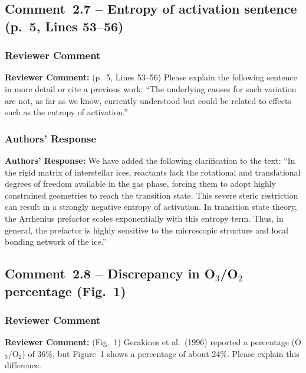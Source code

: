 \documentclass[12pt]{article}
\newcommand{\reviewlabel}{\textbf{\textcolor{commentframe}{Reviewer Comment:}}}
\newcommand{\responselabel}{\textbf{\textcolor{responseframe}{Authors' Response:}}}
\begin{document}
\subsection{Comment~2.7 -- Entropy of activation sentence (p.~5, Lines 53--56)}

\subsubsection{Reviewer Comment}
\begin{reviewerbox}
\reviewlabel{} (p.~5, Lines 53--56) Please explain the following sentence in
more detail or cite a previous work: ``The underlying causes for such
variation are not, as far as we know, currently understood but could be
related to effects such as the entropy of activation.''
\end{reviewerbox}

\subsubsection{Authors' Response}
\begin{responsebox}
\responselabel{} We have added the following clarification to the text: ``In the rigid matrix of interstellar ices, reactants lack the rotational and translational degrees of freedom available in the gas phase, forcing them to adopt highly constrained geometries to reach the transition state. This severe steric restriction can result in a strongly negative entropy of activation. In transition state theory, the Arrhenius prefactor scales exponentially with this entropy term. Thus, in general, the prefactor is highly sensitive to the microscopic structure and local bonding network of the ice.''
\end{responsebox}

\subsection{Comment~2.8 -- Discrepancy in O$_3$/O$_2$ percentage (Fig.~1)}

\subsubsection{Reviewer Comment}
\begin{reviewerbox}
\reviewlabel{} (Fig.~1) Gerakines et al.\ (1996) reported a percentage
(O$_3$/O$_2$) of 36\%, but Figure~1 shows a percentage of about 24\%. Please
explain this difference.
\end{reviewerbox}
\end{document}
